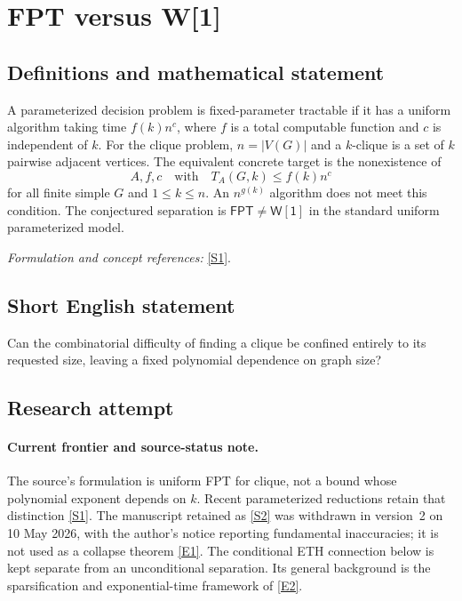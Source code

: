 \documentclass[11pt,a4paper]{article}
\numberwithin{equation}{section}
\newcommand{\sref}[2]{\hyperlink{source:#1:#2}{[S#2]}}
\newcommand{\eref}[2]{\hyperlink{extra:#1:#2}{[E#2]}}
\newif\ifshowcatalogue
\newcommand{\cataloguescope}[1]{\ifshowcatalogue
 \paragraph{Exact scope in the supplied catalogue.}
 \begin{quote}\small #1\end{quote}\fi}
\begin{document}
\setcounter{section}{0}
\section*{\texorpdfstring{FPT versus W[1]}{FPT versus W[1]}}\label{30006712}
\subsection{Definitions and mathematical statement}
A parameterized decision problem is fixed-parameter tractable if it has a uniform algorithm taking time $f(k)n^c$, where $f$ is a total computable function and $c$ is independent of $k$. For the clique problem, $n=|V(G)|$ and a $k$-clique is a set of $k$ pairwise adjacent vertices. The equivalent concrete target is the nonexistence of
\[
 A,f,c\quad\text{with}\quad T_A(G,k)\le f(k)n^c
\]
for all finite simple $G$ and $1\le k\le n$. An $n^{g(k)}$ algorithm does not meet this condition. The conjectured separation is $\mathsf{FPT}\ne\mathsf{W[1]}$ in the standard uniform parameterized model.
\par\smallskip\textit{Formulation and concept references:} \sref{30006712}{1}.
\cataloguescope{Prove or disprove FPT!=W[1] in classical uniform parameterized complexity. Equivalently, determine whether there is a deterministic algorithm, a total computable function f:N->N and an absolute constant c such that on every finite simple n-vertex graph G and every integer 1<=k<=n it decides the existence of a k-clique within f(k)n\textasciicircum{}c steps. The conjecture asserts no such algorithm. The function and exponent are fixed with the algorithm; no input-length advice, oracle or nonuniform circuit family is allowed.}
\subsection{Short English statement}
Can the combinatorial difficulty of finding a clique be confined entirely to its requested size, leaving a fixed polynomial dependence on graph size?
\subsection{Research attempt}

\paragraph{Current frontier and source-status note.}
The source's formulation is uniform FPT for clique, not a bound whose
polynomial exponent depends on $k$. Recent parameterized reductions retain
that distinction \sref{30006712}{1}. The manuscript retained as \sref{30006712}{2}
was withdrawn in version~2 on 10 May 2026, with the author's notice reporting
fundamental inaccuracies; it is not used as a collapse theorem
\eref{30006712}{1}. The conditional ETH connection below is kept separate from
an unconditional separation. Its general background is the sparsification
and exponential-time framework of \eref{30006712}{2}.
\end{document}
